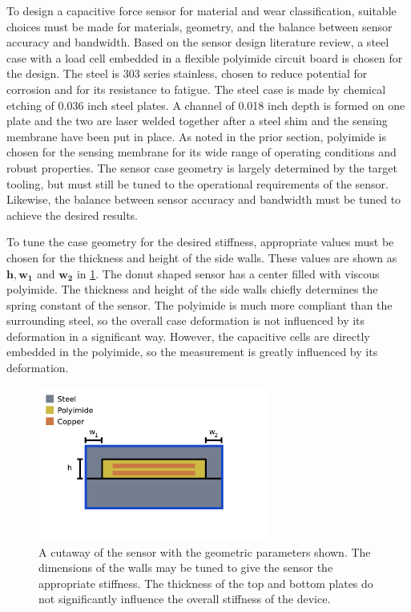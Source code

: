 To design a capacitive force sensor for material and wear classification, suitable choices must be made for
 materials, geometry, and the balance between sensor accuracy and bandwidth. 
Based on the sensor design literature review, 
 a steel case with a load cell embedded in a flexible polyimide circuit board is chosen for the design. 
The steel is 303 series stainless, chosen to reduce potential for corrosion and for its
 resistance to fatigue.
The steel case is made by chemical etching of 0.036 inch steel plates. 
A channel of 0.018 inch depth is formed on one plate and the two are laser welded together after
 a steel shim and the sensing membrane have been put in place.
As noted in the prior section, polyimide is chosen for the sensing membrane for its
 wide range of operating conditions and robust properties.
The sensor case geometry is largely determined by the target tooling, but must still be tuned to the operational
 requirements of the sensor. 
Likewise, the balance between sensor accuracy and bandwidth must be tuned to achieve the desired results.

To tune the case geometry for the desired stiffness, appropriate values must be chosen for the
 thickness and height of the side walls.
These values are shown as $\mathbf{h}, \mathbf{w_1}$ and $ \mathbf{w_2}$ in \ref{fig:sensecut}.
The donut shaped sensor has a center filled with viscous polyimide. 
The thickness and height of the side walls chiefly determines the spring constant of the sensor.
The polyimide is much more compliant than the surrounding steel, so the overall case deformation is not 
 influenced by its deformation in a significant way.
However, the capacitive cells are directly embedded in the polyimide, so the measurement is greatly 
 influenced by its deformation.


\begin{figure}[t!]
\centering
\includegraphics[width=3in]{figures/p1_media/Fig3.png}
\caption{
A cutaway of the sensor with the geometric parameters shown. The dimensions of the walls
 may be tuned to give the sensor the appropriate stiffness. The thickness of the top and bottom plates
 do not significantly influence the overall stiffness of the device.
}
\label{fig:sensecut}
\end{figure}


